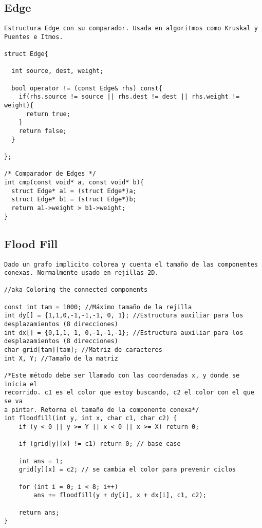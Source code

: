 \documentclass[10pt,letterpaper,twocolumn,twosided]{article}
\begin{document}
\subsection{Edge}
\begin{lstlisting}
Estructura Edge con su comparador. Usada en algoritmos como Kruskal y Puentes e Itmos.

struct Edge{

  int source, dest, weight;

  bool operator != (const Edge& rhs) const{
    if(rhs.source != source || rhs.dest != dest || rhs.weight != weight){
      return true;
    }
    return false;
  }

};

/* Comparador de Edges */
int cmp(const void* a, const void* b){   
  struct Edge* a1 = (struct Edge*)a;
  struct Edge* b1 = (struct Edge*)b;
  return a1->weight > b1->weight;
}\end{lstlisting}

\subsection{Flood Fill}
\begin{lstlisting}
Dado un grafo implicito colorea y cuenta el tamaño de las componentes conexas. Normalmente usado en rejillas 2D.

//aka Coloring the connected components

const int tam = 1000; //Máximo tamaño de la rejilla
int dy[] = {1,1,0,-1,-1,-1, 0, 1}; //Estructura auxiliar para los desplazamientos (8 direcciones)
int dx[] = {0,1,1, 1, 0,-1,-1,-1}; //Estructura auxiliar para los desplazamientos (8 direcciones)
char grid[tam][tam]; //Matriz de caracteres
int X, Y; //Tamaño de la matriz

/*Este método debe ser llamado con las coordenadas x, y donde se inicia el 
recorrido. c1 es el color que estoy buscando, c2 el color con el que se va 
a pintar. Retorna el tamaño de la componente conexa*/
int floodfill(int y, int x, char c1, char c2) { 
	if (y < 0 || y >= Y || x < 0 || x >= X) return 0;
	
	if (grid[y][x] != c1) return 0; // base case
	
	int ans = 1; 
	grid[y][x] = c2; // se cambia el color para prevenir ciclos
	
	for (int i = 0; i < 8; i++)
		ans += floodfill(y + dy[i], x + dx[i], c1, c2);
	
	return ans;
}
\end{lstlisting}
\end{document}
